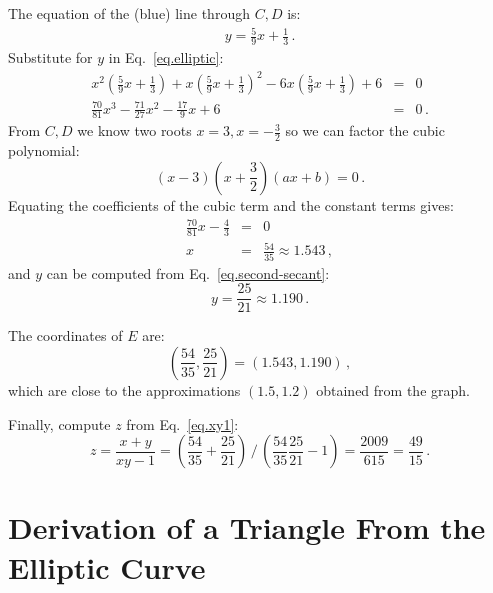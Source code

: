 The equation of the (blue) line through $C,D$ is:
\begin{align}
y = \frac{5}{9}x + \frac{1}{3}\,.\label{eq.second-secant}
\end{align}
Substitute for $y$ in Eq.~\ref{eq.elliptic}:
\begin{eqnarray*}
x^2\left(\frac{5}{9}x + \frac{1}{3}\right) + x\left(\frac{5}{9}x + \frac{1}{3}\right)^2 -6x\left(\frac{5}{9}x + \frac{1}{3}\right) +6 &=&0\\
\frac{70}{81}x^3 - \frac{71}{27}x^2 - \frac{17}{9}x +6 &=&0\,.
\end{eqnarray*}
From $C,D$ we know two roots $x=3,x=-\frac{3}{2}$ so we can factor the cubic polynomial:
\[
(x-3)\left(x+\frac{3}{2}\right)(ax+b)=0\,.
\]
Equating the coefficients of the cubic term and the constant terms gives:
\begin{eqnarray*}
\frac{70}{81}x - \frac{4}{3}&=&0\\
x&=& \frac{54}{35}\approx 1.543\,,
\end{eqnarray*}
and $y$ can be computed from Eq.~\ref{eq.second-secant}:
\[
y=\frac{25}{21}\approx 1.190\,.
\]

\newpage

The coordinates of $E$ are:
\[
\left(\frac{54}{35}, \frac{25}{21}\right)=(1.543,1.190)\,,
\]
which are close to the approximations $(1.5,1.2)$ obtained from the graph.

Finally, compute $z$ from Eq.~\ref{eq.xy1}:
\[
z=\frac{x+y}{xy-1}=%
\displaystyle\left(\frac{54}{35} + \frac{25}{21}\right)%
 \, \bigg/ \,%
\displaystyle\left(\frac{54}{35}\frac{25}{21}-1\right)=%
\frac{2009}{615} = \frac{49}{15}\,.
\]

\section{Derivation of a Triangle From the Elliptic Curve}

\enlargethispage*{\baselineskip}


